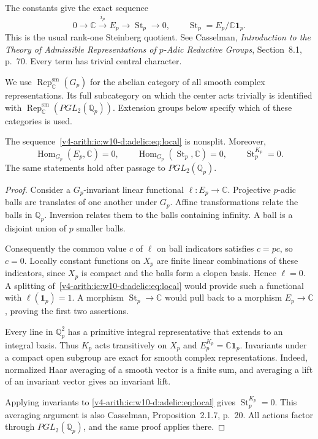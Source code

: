 The constants give the exact sequence
\begin{equation}\label{v4-arith:ic:w10-d:adelic:eq:local}
 0\longrightarrow\mathbb C\xrightarrow{i_p}E_p
   \longrightarrow\operatorname{St}_p\longrightarrow0,
 \qquad \operatorname{St}_p=E_p/\mathbb C\mathbf1_p.
\end{equation}
This is the usual rank-one Steinberg quotient.
See Casselman, \emph{Introduction to the Theory of Admissible
Representations of $p$-Adic Reductive Groups}, Section~8.1, p.~70. Every term has trivial central character.

We use $\operatorname{Rep}^{\mathrm{sm}}_{\mathbb C}(G_p)$ for the abelian category of all smooth complex
representations. Its full subcategory on which the center acts trivially
is identified with $\operatorname{Rep}^{\mathrm{sm}}_{\mathbb C}(PGL_2(\mathbb Q_p))$. Extension groups below specify
which of these categories is used.

\begin{lemma}\label{v4-arith:ic:w10-d:adelic:lem:local}
The sequence~\eqref{v4-arith:ic:w10-d:adelic:eq:local} is nonsplit. Moreover,
\[
 \operatorname{Hom}_{G_p}(E_p,\mathbb C)=0,\qquad
 \operatorname{Hom}_{G_p}(\operatorname{St}_p,\mathbb C)=0,\qquad
 \operatorname{St}_p^{K_p}=0.
\]
The same statements hold after passage to $PGL_2(\mathbb Q_p)$.
\end{lemma}
\begin{proof}
Consider a $G_p$-invariant linear functional $\ell:E_p\to\mathbb C$.
Projective $p$-adic balls are translates of one another under $G_p$.
Affine transformations relate the balls in $\mathbb Q_p$.
Inversion relates them to the balls containing infinity. A ball is a disjoint union
of $p$ smaller balls.

Consequently the common value $c$ of $\ell$ on
ball indicators satisfies $c=pc$, so $c=0$. Locally constant functions
on $X_p$ are finite linear combinations of these indicators, since $X_p$
is compact and the balls form a clopen basis. Hence $\ell=0$.
A splitting of~\eqref{v4-arith:ic:w10-d:adelic:eq:local} would provide such a functional with
$\ell(\mathbf1_p)=1$. A morphism $\operatorname{St}_p\to\mathbb C$ would pull back to a
morphism $E_p\to\mathbb C$, proving the first two assertions.

Every line in $\mathbb Q_p^2$ has a primitive integral representative that extends
to an integral basis. Thus $K_p$ acts transitively on $X_p$ and
$E_p^{K_p}=\mathbb C\mathbf1_p$. Invariants under a compact open subgroup
are exact for smooth complex representations. Indeed, normalized Haar
averaging of a smooth vector is a finite sum, and averaging a lift of an
invariant vector gives an invariant lift.

Applying invariants to
\eqref{v4-arith:ic:w10-d:adelic:eq:local} gives $\operatorname{St}_p^{K_p}=0$. This averaging argument is also
Casselman, Proposition~2.1.7, p.~20.
All actions factor through $PGL_2(\mathbb Q_p)$, and the same proof applies there.
\end{proof}

